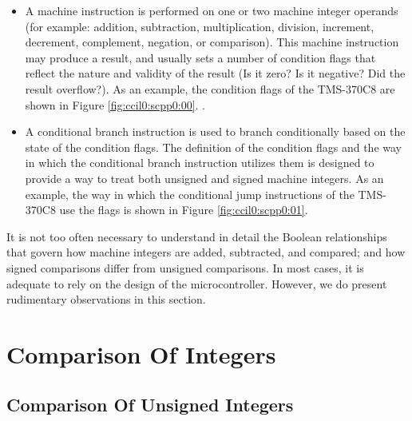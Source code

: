 \begin{itemize}
\item A machine instruction is performed on one or two machine 
      integer operands (for example:  addition, subtraction, 
      multiplication, division, increment, decrement, complement,
      negation, or comparison).  This machine instruction may
      produce a result, and usually sets a number of condition flags that
      reflect the nature and validity of the result (Is it zero?
      Is it negative?  Did the result overflow?).  As an
      example, the condition
      flags of the TMS-370C8 are shown in Figure \ref{fig:ccil0:scpp0:00}.
      .
\item A conditional branch instruction is used to branch conditionally
      based on the state of the condition flags.  The definition of
      the condition flags and the way in which the conditional
      branch instruction utilizes them is designed to provide a
      way to treat both unsigned and signed machine integers.
      As an example, the way in which the conditional
      jump instructions of the TMS-370C8 use the flags
      is shown in Figure \ref{fig:ccil0:scpp0:01}.
\end{itemize}

It is not too often necessary to understand in detail
the Boolean relationships that govern how machine integers are
added, subtracted, and compared; and how signed comparisons differ
from unsigned comparisons.  In most cases, it is adequate to
rely on the design of the microcontroller.  However, we do present
rudimentary observations in this section.



\section{Comparison Of Integers}


\subsection{Comparison Of Unsigned Integers}


